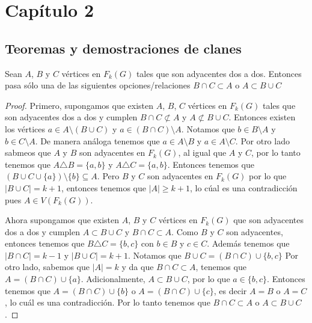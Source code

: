 \chapter{Cap\'i{}tulo 2}%
\label{cap:ejemplos}

\section{Teoremas y demostraciones de clanes}%
\label{sec:etiquetas}


\begin{lema}%
        \label{lem:primero}
        Sean $A$, $B$ y $C$ v\'ertices en $F_k(G)$ tales que son adyacentes
        dos a dos. Entonces pasa s\'olo una de las siguientes
        opciones/relaciones $B \cap C \subset A$ o $A \subset B \cup C$
        \end{lema}

    
    \begin{proof}
        Primero, supongamos que existen $A$, $B$, $C$ v\'ertices en $F_k(G)$
        tales que son adyacentes dos a dos y cumplen $B \cap C \not\subset A$ y
        $A \not\subset B \cup C$. Entonces existen los v\'ertices  $a \in A
        \setminus (B \cup C)$ y $a \in (B \cap C)\setminus A$. Notamos que $b
        \in B \setminus A$ y $b \in C \setminus A$. De manera an\'aloga tenemos
        que $a \in A \setminus B$ y $a \in A \setminus C$. Por otro lado sabmeos
        que $A$ y $B$ son adyacentes en $F_k(G)$, al igual que $A$ y $C$, por lo
        tanto tenemos que $A \triangle B = \{a,b\}$ y $A \triangle C = \{a,
        b\}$. Entonces tenemos que $(B \cup C \cup \{a\})\setminus \{b\}
        \subseteq A$. Pero $B$ y $C$ son adyacentes en $F_k(G)$ por lo que $|B
        \cup C| = k+1$, entonces tenemos que $|A| \geq k+1$, lo c\'ual es una
        contradicci\'on pues $A \in V (F_k(G))$. 

        Ahora supongamos que existen $A$, $B$ y $C$ v\'ertices en $F_k(G)$ que
        son adyacentes dos a dos y cumplen $A \subset B \cup C$ y $B \cap C
        \subset A$. Como $B$ y $C$ son adyacentes, entonces tenemos que $B
        \triangle C = \{b,c\}$ con $b \in B$ y $c \in C$. Adem\'as tenemos que
        $|B \cap C| = k-1$ y $|B \cup C| = k +1$. Notamos que $B \cup C = (B\cap
        C) \cup \{b,c\}$ Por otro lado, sabemos que $|A|=k$ y da que $B \cap C
        \subset A$, tenemos que $A = (B \cap C) \cup \{a\}$. Adicionalmente, $A
        \subset B \cup C$, por lo que $a \in \{b, c\}$. Entonces tenemos que $A
        = (B \cap C) \cup \{b\}$ o $A = (B \cap C) \cup \{c\}$, es decir $A = B$
        o $A=C$, lo cu\'al es una contradicci\'on. Por lo tanto tenemos que $B
        \cap C \subset A$ o $A \subset B \cup C$.
    \end{proof}

